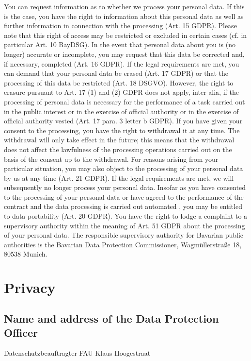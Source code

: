 \documentclass[letterpaper,10pt,english]{sphinxmanual}
\begin{document}
\sphinxAtStartPar
You can request information as to whether we process your personal data. If this is the case, you have the right to information about this personal data as well as further information in connection with the processing (Art. 15 GDPR). Please note that this right of access may be restricted or excluded in certain cases (cf. in particular Art. 10 BayDSG).
In the event that personal data about you is (no longer) accurate or incomplete, you may request that this data be corrected and, if necessary, completed (Art. 16 GDPR).
If the legal requirements are met, you can demand that your personal data be erased (Art. 17 GDPR) or that the processing of this data be restricted (Art. 18 DSGVO). However, the right to erasure pursuant to Art. 17 (1) and (2) GDPR does not apply, inter alia, if the processing of personal data is necessary for the performance of a task carried out in the public interest or in the exercise of official authority or in the exercise of official authority vested (Art. 17 para. 3 letter b GDPR).
If you have given your consent to the processing, you have the right to withdrawal it at any time. The withdrawal will only take effect in the future; this means that the withdrawal does not affect the lawfulness of the processing operations carried out on the basis of the consent up to the withdrawal.
For reasons arising from your particular situation, you may also object to the processing of your personal data by us at any time (Art. 21 GDPR). If the legal requirements are met, we will subsequently no longer process your personal data.
Insofar as you have consented to the processing of your personal data or have agreed to the performance of the contract and the data processing is carried out automated , you may be entitled to data portability (Art. 20 GDPR).
You have the right to lodge a complaint to a supervisory authority within the meaning of Art. 51 GDPR about the processing of your personal data. The responsible supervisory authority for Bavarian public authorities is the Bavarian Data Protection Commissioner, Wagmüllerstraße 18, 80538 Munich.

\sphinxstepscope


\section{Privacy}
\label{\detokenize{policies/privacy:privacy}}\label{\detokenize{policies/privacy::doc}}

\subsection{Name and address of the Data Protection Officer}
\label{\detokenize{policies/privacy:name-and-address-of-the-data-protection-officer}}
\sphinxAtStartPar
Datenschutzbeauftragter FAU
Klaus Hoogestraat
\end{document}
